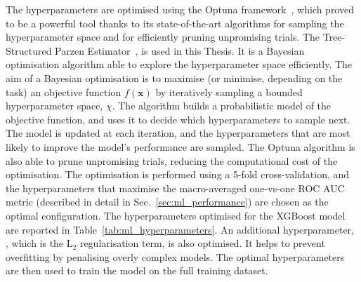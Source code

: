 The hyperparameters are optimised using the Optuna framework~\cite{akiba2019optuna}, which proved to be a powerful tool thanks to its state-of-the-art algorithms for sampling the hyperparameter space and for efficiently pruning unpromising trials. The Tree-Structured Parzen Estimator~\cite{bergstra2011algorithms}, is used in this Thesis. It is a Bayesian optimisation algorithm able to explore the hyperparameter space efficiently. The aim of a Bayesian optimisation is to maximise (or minimise, depending on the task) an objective function $f(\mathbf{x})$ by iteratively sampling a bounded hyperparameter space, $\chi$. The algorithm builds a probabilistic model of the objective function, and uses it to decide which hyperparameters to sample next. The model is updated at each iteration, and the hyperparameters that are most likely to improve the model's performance are sampled. The Optuna algorithm is also able to prune unpromising trials, reducing the computational cost of the optimisation. The optimisation is performed using a 5-fold cross-validation, and the hyperparameters that maximise the macro-averaged one-vs-one ROC AUC metric (described in detail in Sec.~\ref{sec:ml_performance}) are chosen as the optimal configuration. The hyperparameters optimised for the XGBoost model are reported in Table~\ref{tab:ml_hyperparameters}. An additional hyperparameter, , which is the $\mathrm{L_2}$ regularisation term, is also optimised. It helps to prevent overfitting by penalising overly complex models. The optimal hyperparameters are then used to train the model on the full training dataset.

